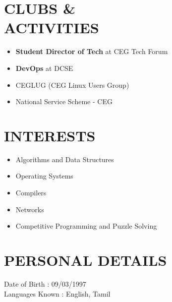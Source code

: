 \documentclass[margin, 10pt]{res} %
\begin{document}
\begin{resume}
\section{CLUBS \& \\ ACTIVITIES}
\begin{itemize}
\item \textbf{Student Director of Tech} at CEG Tech Forum
\item \textbf{DevOps} at DCSE
\item CEGLUG (CEG Linux Users Group)
\item National Service Scheme - CEG
\end{itemize} 


\section{INTERESTS} 
\begin{itemize}
\item Algorithms and Data Structures
\item Operating Systems
\item Compilers
\item Networks
\item Competitive Programming and Puzzle Solving
\end{itemize}
 
\section{PERSONAL DETAILS}
Date of Birth \hspace{18pt} : 09/03/1997 \\
Languages Known \hspace{1pt}: English, Tamil
\end{resume}
\end{document}
